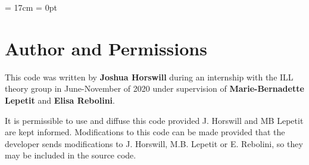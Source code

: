 
\setlength{\parskip}{2ex}
\textwidth = 17cm
\oddsidemargin = 0pt





%

\section{Author and Permissions}
This code was written by {\bf Joshua Horswill} during an internship with the
ILL theory group in June-November of 2020 under supervision of {\bf
  Marie-Bernadette Lepetit} and {\bf Elisa Rebolini}. 


It is permissible to use and diffuse this code provided J. Horswill and MB
Lepetit are kept informed. Modifications to this code can be made provided
that the developer sends modifications to J. Horswill, M.B. Lepetit or
E. Rebolini, so they may be included in the source code. \\


